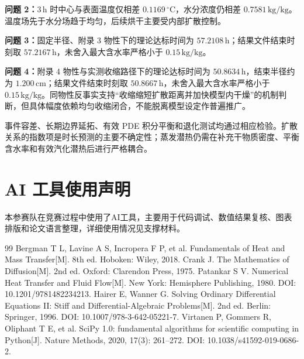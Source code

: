 \documentclass[UTF8,a4paper,zihao=-4,fontset=fandol]{ctexart}
\newcommand{\unit}[1]{\,\mathrm{#1}}
\begin{document}
\textbf{问题 2：}$3\unit{h}$ 时中心与表面温度仅相差 $0.1169\,^{\circ}\mathrm{C}$，水分浓度仍相差 $0.7581\unit{kg/kg}$。温度场先于水分场趋于均匀，后续烘干主要受内部扩散控制。

\textbf{问题 3：}固定半径、附录 3 物性下的理论达标时间为 $57.2108\unit{h}$；结果文件结束时刻取 $57.2167\unit{h}$，未舍入最大含水率严格小于 $0.15\unit{kg/kg}$。

\textbf{问题 4：}附录 4 物性与实测收缩路径下的理论达标时间为 $50.8634\unit{h}$，结束半径约为 $1.200\unit{cm}$；结果文件结束时刻取 $50.8667\unit{h}$，未舍入最大含水率严格小于 $0.15\unit{kg/kg}$。同物性反事实支持“收缩缩短扩散距离并加快模型内干燥”的机制判断，但具体幅度依赖均匀收缩闭合，不能脱离模型设定作普遍推广。

事件容差、长期边界延拓、有效 PDE 积分平衡和退化测试均通过相应检验。扩散关系的指数项是时长预测的主要不确定性；蒸发潜热仍需在补充干物质密度、平衡含水率和有效汽化潜热后进行严格耦合。

\section*{AI 工具使用声明}

本参赛队在竞赛过程中使用了AI工具，主要用于代码调试、数值结果复核、图表排版和论文语言整理，详细使用情况见支撑材料。

\begin{thebibliography}{99}
 Bergman T L, Lavine A S, Incropera F P, et al. Fundamentals of Heat and Mass Transfer[M]. 8th ed. Hoboken: Wiley, 2018.
 Crank J. The Mathematics of Diffusion[M]. 2nd ed. Oxford: Clarendon Press, 1975.
 Patankar S V. Numerical Heat Transfer and Fluid Flow[M]. New York: Hemisphere Publishing, 1980. DOI: 10.1201/9781482234213.
 Hairer E, Wanner G. Solving Ordinary Differential Equations II: Stiff and Differential-Algebraic Problems[M]. 2nd ed. Berlin: Springer, 1996. DOI: 10.1007/978-3-642-05221-7.
 Virtanen P, Gommers R, Oliphant T E, et al. SciPy 1.0: fundamental algorithms for scientific computing in Python[J]. Nature Methods, 2020, 17(3): 261--272. DOI: 10.1038/s41592-019-0686-2.
\end{thebibliography}
\end{document}
